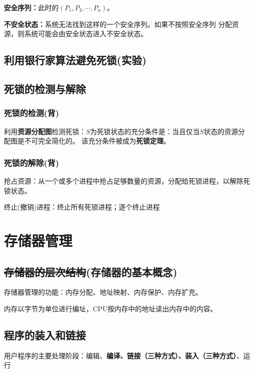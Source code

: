 \documentclass{article}
\begin{document}
\textbf{安全序列：}此时的$(P_1,P_2,\cdots,P_n)$。

\textbf{不安全状态：}系统无法找到这样的一个安全序列。如果不按照安全序列
分配资源，则系统可能会由安全状态进入不安全状态。

\subsection{{\color{gray}利用银行家算法避免死锁(实验)}}
\subsection{死锁的检测与解除}
\subsubsection{{\color{red}死锁的检测}{\color{green}(背)}}
利用\textbf{资源分配图}检测死锁：$S$为死锁状态的充分条件是：当且仅当$S$状态的资源分配图是不可完全简化的。
该充分条件被成为\textbf{死锁定理}。
\subsubsection{{\color{red}死锁的解除}{\color{green}(背)}}
抢占资源：从一个或多个进程中抢占足够数量的资源，分配给死锁进程，以解除死锁状态。

终止(撤销)进程：终止所有死锁进程；逐个终止进程



\clearpage
\section{存储器管理}
\subsection{\sout{存储器的层次结构}\color{red}(存储器的基本概念)}
存储器管理的功能：内存分配、地址映射、内存保护、内存扩充。

内存以字节为单位进行编址，CPU按内存中的地址读出内存中的内容。
\subsection{程序的装入和链接}
用户程序的主要处理阶段：编辑、\textbf{编译、链接（三种方式）、装入（三种方式）}、运行
\end{document}
